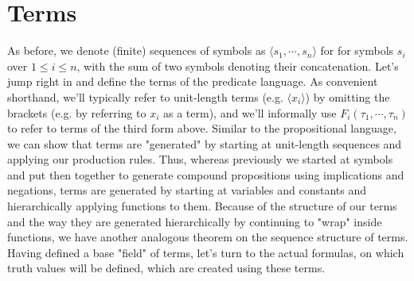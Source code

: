 \documentclass{article}
\begin{document}
\section{Terms}
As before, we denote (finite) sequences of symbols as $ \langle s_1, \cdots, s_n \rangle $ for for symbols $ s_i $ over $ 1 \leq i \leq n $, with the sum of two symbols denoting their concatenation. Let's jump right in and define the terms of the predicate language.
\n
As convenient shorthand, we'll typically refer to unit-length terms (e.g. $ \langle x_i \rangle $) by omitting the brackets (e.g. by referring to $ x_i $ as a term), and we'll informally use $ F_i(\tau_1, \cdots, \tau_n) $ to refer to terms of the third form above. Similar to the propositional language, we can show that terms are "generated" by starting at unit-length sequences and applying our production rules. Thus, whereas previously we started at symbols and put then together to generate compound propositions using implications and negations, terms are generated by starting at variables and constants and hierarchically applying functions to them.
Because of the structure of our terms and the way they are generated hierarchically by continuing to "wrap" inside functions, we have another analogous theorem on the sequence structure of terms.
Having defined a base "field" of terms, let's turn to the actual formulas, on which truth values will be defined, which are created using these terms.
\end{document}
